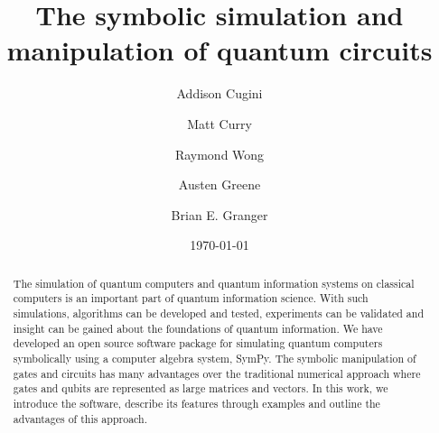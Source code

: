 \documentclass[aps,pra,groupedaddress]{revtex4-1}
\begin{document}

\title{The symbolic simulation and manipulation of quantum circuits}



\author{Addison Cugini}
\author{Matt Curry}
\author{Raymond Wong}
\author{Austen Greene}
\author{Brian E. Granger}


\date{\today}

\begin{abstract}

The simulation of quantum computers and quantum information systems on classical computers
is an important part of quantum information science.  With such simulations, algorithms can be developed and tested, experiments can be validated and insight can be gained about the foundations of quantum information.  We have developed an open source software package for simulating quantum computers symbolically using a computer algebra system, SymPy.  The symbolic manipulation of gates and circuits has many advantages over the traditional numerical approach where gates and qubits are represented as large matrices and vectors.  In this work, we introduce the software, describe its features through examples and outline the advantages of this approach.

\end{abstract}
\end{document}
